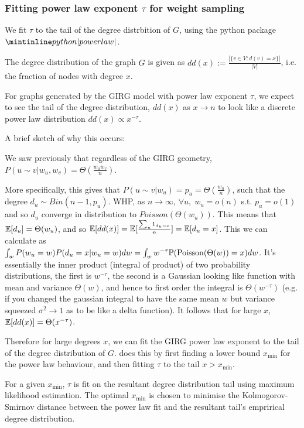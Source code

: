 \subsubsection{Fitting power law exponent $\tau$ for weight sampling}
We fit $\tau$ to the tail of the degree distrbition of $G$, using the python package $\PLP$.

The degree distribution of the graph $G$ is given as $dd(x) := \frac{|\{v \in V: d(v) = x\}|}{|V|}$, i.e. the fraction of nodes with degree $x$.

For graphs generated by the GIRG model with power law exponent $\tau$, we expect to see the tail of the degree distribution, $dd(x)$ as $x \to n$ to look like a discrete power law distribution $dd(x) \propto x^{-\tau}$.

A brief sketch of why this occurs:

We saw previously that regardless of the GIRG geometry, $P(u \sim v | w_u, w_v) = \Theta(\frac{w_u w_v}{n})$.

More specifically, this gives that $P(u \sim v | w_u) = p_u = \Theta(\frac{w_u}{n})$, such that the degree $d_u \sim Bin(n-1, p_u)$.
WHP, as $n \to \infty$, $\forall u,\; w_u = o(n)$ s.t. $p_u = o(1)$ and so $d_u$ converge in distribution to $Poisson(\Theta(w_u))$.
This means that $\mathbb{E}[d_u] = \Theta(w_u)$, and so $\mathbb{E}[dd(x)] = \mathbb{E}[ \frac{ \sum_u 1_{d_u = x}}{n}] = \mathbb{E}[d_u = x]$. This we can calculate as $\int_w P(w_u = w) P(d_u = x | w_u = w)dw = \int_w w^{-\tau} \mathbb{P}(\operatorname{Poisson}(\Theta(w)) = x) dw$. It's essentially the inner product (integral of product) of two probability distributions, the first is $w^{-\tau}$, the second is a Gaussian looking like function with mean and variance $\Theta(w)$, and hence to first order the integral is $\Theta(w^{-\tau})$ (e.g. if you changed the gaussian integral to have the same mean $w$ but variance squeezed $\sigma^2 \to 1$ as to be like a delta function). It follows that for large $x$, $\mathbb{E}[dd(x)] = \Theta(x^{-\tau})$.

Therefore for large degrees $x$, we can fit the GIRG power law exponent to the tail of the degree distribution of $G$. \PLP does this by first finding a lower bound $x_{\min}$ for the power law behaviour, and then fitting $\tau$ to the tail $x > x_{\min}$.


For a given $x_{\min}$, $\tau$ is fit on the resultant degree distribution tail using maximum likelihood estimation. The optimal $x_{\min}$ is chosen to minimise the Kolmogorov-Smirnov distance between the power law fit and the resultant tail's emprirical degree distribution.

